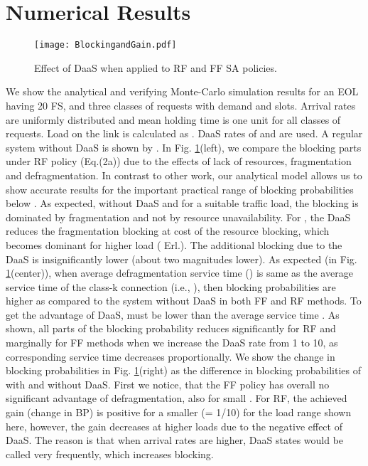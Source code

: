 \documentclass[letterpaper,10pt]{article}
\begin{document}
\section{Numerical Results}
\begin{figure}[t]
 \centering
\texttt{[image: BlockingandGain.pdf]}
\vspace{-8mm}
  \caption{Effect of DaaS when applied to RF and FF SA policies.}
\label{fig:defrag}
\vspace{-2mm}
\end{figure}
We show the analytical and verifying Monte-Carlo simulation results for an EOL having 20 FS, and three classes of requests with demand  and  slots. Arrival rates are uniformly distributed and mean holding time is one unit for all classes of requests. Load on the link is calculated as . DaaS rates of  and  are used. A regular system without DaaS is shown by . In Fig. \ref{fig:defrag}(left), we compare the blocking parts under RF policy (Eq.(2a)) due to the effects of lack of resources, fragmentation and defragmentation. In contrast to other work, our analytical model allows us to show accurate results for the important practical range of blocking probabilities below . As expected, without DaaS and for a suitable traffic load, the blocking is dominated by fragmentation and not by resource unavailability. For , the DaaS  reduces the fragmentation blocking at cost of the resource blocking, which becomes dominant for higher load ( Erl.). The additional blocking due to the DaaS is insignificantly lower (about two magnitudes lower). As expected (in Fig. \ref{fig:defrag}(center)), when average defragmentation service time () is same as the average service time of the class-k connection (i.e., ), then blocking probabilities are higher as compared to the system without DaaS in both FF and RF methods. To get the advantage of DaaS,  must be lower than the average service time . As shown, all parts of the blocking probability reduces significantly for RF and marginally for FF methods when we increase the DaaS rate from 1 to 10, as corresponding service time decreases proportionally. We show the change in blocking probabilities in Fig. \ref{fig:defrag}(right) as the difference in blocking probabilities of with and without DaaS. First we notice, that the FF policy has overall no significant advantage of defragmentation, also for small . For RF, the achieved gain (change in BP) is positive for a smaller  (= 1/10) for the load range shown here, however, the gain decreases at higher loads due to the negative effect of DaaS. The reason is that when arrival rates are higher, DaaS states would be called very frequently, which increases blocking. 
\vspace{-2mm}
\end{document}
